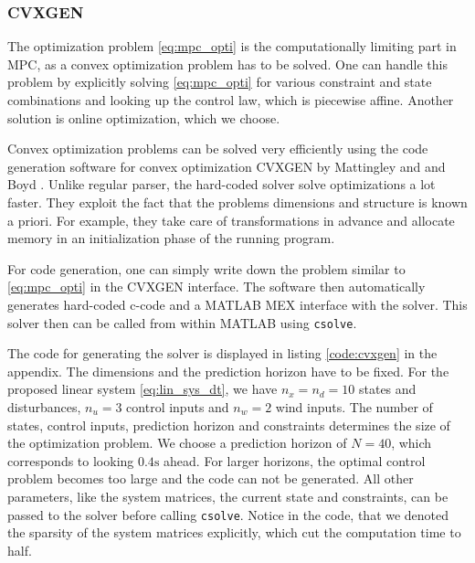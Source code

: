\subsubsection{CVXGEN}
The optimization problem \ref{eq:mpc_opti} is the computationally limiting part in MPC, as a convex optimization problem has to be solved. One can handle this problem by explicitly solving \ref{eq:mpc_opti} for various constraint and state combinations and looking up the control law, which is piecewise affine. Another solution is online optimization, which we choose.

Convex optimization problems can be solved very efficiently using the code generation software for convex optimization CVXGEN by Mattingley and and Boyd \cite{Mattingley2010}. Unlike regular parser, the hard-coded solver solve optimizations a lot faster. They exploit the fact that the problems dimensions and structure is known a priori. For example, they take care of transformations in advance and allocate memory in an initialization phase of the running program.

For code generation, one can simply write down the problem similar to \ref{eq:mpc_opti} in the CVXGEN interface. The software then automatically generates hard-coded c-code and a MATLAB MEX interface with the solver. This solver then can be called from within MATLAB using \texttt{csolve}.

The code for generating the solver is displayed in listing \ref{code:cvxgen} in the appendix. The dimensions and the prediction horizon have to be fixed. For the proposed linear system \ref{eq:lin_sys_dt}, we have $n_x=n_d=10$ states and disturbances, $n_u=3$ control inputs and $n_w=2$ wind inputs. The number of states, control inputs, prediction horizon and constraints determines the size of the optimization problem. We choose a prediction horizon of $N=40$, which corresponds to looking $0.4\si{\second}$ ahead. For larger horizons, the optimal control problem becomes too large and the code can not be generated. All other parameters, like the system matrices, the current state and constraints, can be passed to the solver before calling \texttt{csolve}. Notice in the code, that we denoted the sparsity of the system matrices explicitly, which cut the computation time to half.

